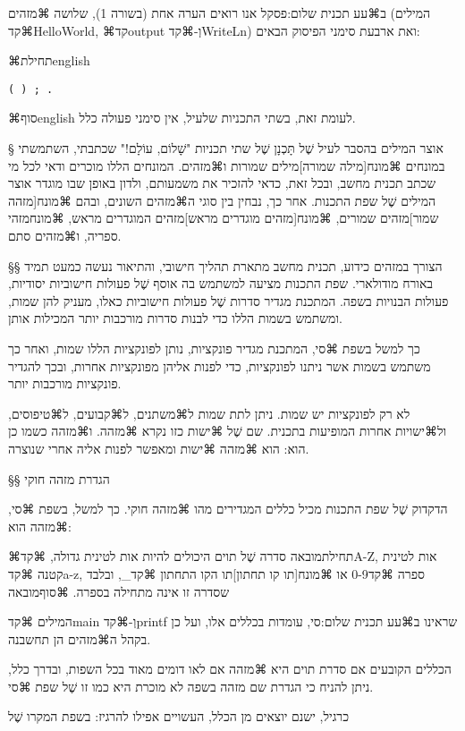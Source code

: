 ב⌘עע תכנית שלום:פסקל אנו רואים הערה אחת (בשורה 1), שלושה ⌘מזהים (המילים
⌘קד{HelloWorld}, ⌘קד{output} וְ-⌘קד{WriteLn}) ואת ארבעת סימני הפיסוק הבאים:

⌘תחילת{english}
\let\ttfamily=\listingsfont
\begin{verbatim}
( ) ; .
\end{verbatim}
⌘סוף{english}
לעומת זאת, בשתי התכניות שלעיל, אין סימני פעולה כלל.

§ אוצר המילים
בהסבר לעיל שֶׁל תָּכְנָן שֶׁל שתי תכניות "שָׁלוֹם, עוֹלָם!" שכתבתי, השתמשתי במונחים
⌘מונח[מילה שמורה]{מילים שמורות} ו⌘מזהים. המונחים הללו מוכרים
ודאי לכל מי שכתב תכנית מחשב,
ובכל זאת, כדאי להזכיר את משמעותם, ולדון באופן שבו מוגדר אוצר המילים שֶׁל שפת
התכנות. אחר כך, נבחין בין סוגי ה⌘מזהים השונים, ובהם
⌘מונח[מזהה שמור]{מזהים שמורים},
⌘מונח[מזהים מוגדרים מראש]{מזהים המוגדרים מראש}, ⌘מונח{מזהי ספריה}, ו⌘מזהים סתם.

§§ הצורך במזהים
כידוע, תכנית מחשב מתארת תהליך חישובי, והתיאור נעשה כמעט תמיד באורח מודולארי.
שפת התכנות מציעה למשתמש בה אוסף שֶׁל פעולות חישוביות יסודיות, פעולות הבנויות
בשפה. המתכנת מגדיר סדרות שֶׁל פעולות חישוביות כאלו, מעניק להן שמות, ומשתמש
בשמות הללו כדי לבנות סדרות מורכבות יותר המכילות אותן.

כך למשל בשפת ⌘סי, המתכנת מגדיר פונקציות, נותן לפונקציות הללו שמות, ואחר כך
משתמש בשמות אשר ניתנו לפונקציות, כדי לפנות אליהן מפונקציות אחרות, ובכך להגדיר
פונקציות מורכבות יותר.

לא רק לפונקציות יש שמות. ניתן לתת שמות ל⌘משתנים, ל⌘קבועים,
ל⌘טיפוסים, ול⌘ישויות
אחרות המופיעות בתכנית. שם שֶׁל ⌘ישות כזו נקרא ⌘מזהה.
ו⌘מזהה כשמו כן הוא: הוא ⌘מזהה ⌘ישות ומאפשר לפנות אליה אחרי
שנוצרה.

§§ הגדרת מזהה חוקי

הדקדוק שֶׁל שפת התכנות מכיל כללים המגדירים מהו ⌘מזהה חוקי.
כך למשל, בשפת ⌘סי, ⌘מזהה הוא:

⌘תחילת{מובאה}
סדרה שֶׁל תוים היכולים להיות אות לטינית גדולה, ⌘קד{A-Z},
אות לטינית קטנה ⌘קד{a-z}, ספרה ⌘קד{0-9} או
⌘מונח[תו קו תחתון]{תו הקו התחתון}
⌘קד{\_},
ובלבד שסדרה זו אינה מתחילה בספרה.
⌘סוף{מובאה}

המילים ⌘קד{main} וְ-⌘קד{printf} שראינו ב⌘עע תכנית שלום:סי, עומדות בכללים אלו,
ועל כן בקהל ה⌘מזהים הן תחשבנה.

הכללים הקובעים אם סדרת תוים היא ⌘מזהה אם לאו דומים מאוד בכל השפות,
ובדרך כלל, ניתן להניח כי הגדרת שם מזהה בשפה לא מוכרת היא כמו זו שֶׁל שפת ⌘סי.

כרגיל, ישנם יוצאים מן הכלל, העשויים אפילו להרגיז: בשפת המקרו שֶׁל

